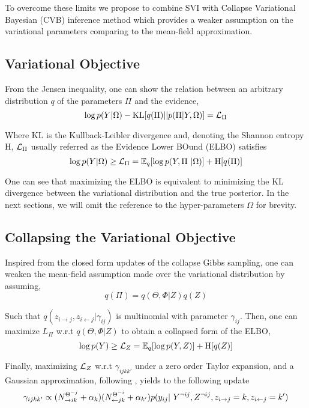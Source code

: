 To overcome these limits we propose to combine SVI with Collapse Variational Bayesian (CVB) inference method \cite{teh2006collapsed} which provides a weaker assumption on the variational parameters comparing to the mean-field approximation.


\subsection{Variational Objective}

From the Jensen inequality, one can show the relation between an arbitrary distribution $q$ of the parameters $\Pi$ and the evidence, 
\begin{equation*}
\log p(Y | \Omega) - \textrm{KL}[q(\Pi)||p(\Pi | Y, \Omega)] = \mathcal{L}_\Pi
\end{equation*}

Where $\textrm{KL}$ is the Kullback-Leibler divergence and, denoting the Shannon entropy $\textrm{H}$, $\mathcal{L}_\Pi$ usually referred as the Evidence Lower BOund (ELBO) satisfies
\begin{equation*}
\log p(Y|\Omega) \geq \mathcal{L}_\Pi = \mathbb{E}_{q}[\log p(Y, \Pi\ | \Omega)] + \textrm{H}[q(\Pi)] 
\end{equation*}

One can see that maximizing the ELBO is equivalent to minimizing the KL divergence between the variational distribution and the true posterior.
In the next sections, we will omit the reference to the hyper-parameters $\Omega$ for brevity.

\subsection{Collapsing the Variational Objective}
Inspired from the closed form updates of the collapse Gibbs sampling, one can weaken the mean-field assumption made over the variational distribution by assuming,
\begin{equation*}
q(\Pi) = q(\Theta, \Phi | Z) q(Z)
\end{equation*}

Such that $q(z_{i \rightarrow j}, z_{i \leftarrow j}|\gamma_{ij})$ is multinomial with parameter $\gamma_{ij}$. Then, one can maximize $L_\Pi$ w.r.t $q(\Theta, \Phi | Z)$ to obtain a collapsed form of the ELBO,
\begin{equation*}
\log p(Y) \geq \mathcal{L}_Z = \mathbb{E}_{q}[\log p(Y, Z)] + \textrm{H}[q(Z)]
\end{equation*}

Finally, maximizing $\mathcal{L}_Z$ w.r.t $\gamma_{ijkk'}$ under a zero order Taylor expansion, and a Gaussian approximation, following \cite{teh2006collapsed}\cite{asuncion2009smoothing}, yields to the following update
\begin{equation} \label{eq:maximization}
\gamma_{ijkk'} \propto (N_{\rightarrow ik}^{\Theta^{-j}} + \alpha_k) (N_{\leftarrow jk}^{\Theta^{-i}} + \alpha_{k'}) p(y_{ij} | Y^{\neg ij}, Z^{\neg ij}, \zij=k, \zji=k')
\end{equation}

